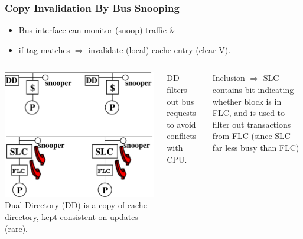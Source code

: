 \documentclass{beamer}
\newcommand{\emp}[1]{\textcolor{DikuRed}{ #1}}
\begin{document}
\begin{frame}[fragile,t]
\frametitle{Copy Invalidation By Bus Snooping}


\begin{itemize}
    \item Bus interface can monitor (snoop) traffic \& 
    \item if tag matches $\Rightarrow$ invalidate (local) cache entry (clear V).
\end  {itemize}
\smallskip

\begin{columns}
\includegraphics[width=35ex]{FigsInfCoherence/SnoopingEg}
\pause
\emp{Dual Directory (DD)} is a copy of cache directory,
kept consistent on updates (rare).

DD filters out bus requests to avoid conflicts with CPU.

\bigskip
Inclusion $\Rightarrow$ \emp{SLC} contains bit indicating whether block is in FLC,
and is used to \emp{filter out transactions from FLC}
(since SLC far less busy than FLC) 
\end{columns} 

\smallskip

\end{frame}
\end{document}
